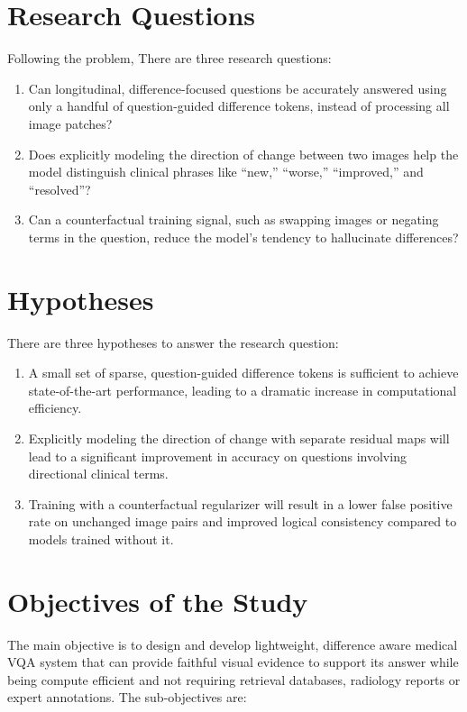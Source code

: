 \section{Research Questions}
Following the problem, There are three research questions:
\begin{enumerate}
    \item Can longitudinal, difference-focused questions be accurately answered using only a handful of question-guided difference tokens, instead of processing all image patches?
    \item Does explicitly modeling the direction of change between two images help the model distinguish clinical phrases like “new,” “worse,” “improved,” and “resolved”?
    \item Can a counterfactual training signal, such as swapping images or negating terms in the question, reduce the model’s tendency to hallucinate differences?
\end{enumerate}

\section{Hypotheses}
There are three hypotheses to answer the research question:
\begin{enumerate}
    \item A small set of sparse, question-guided difference tokens is sufficient to achieve state-of-the-art performance, leading to a dramatic increase in computational efficiency.
    \item Explicitly modeling the direction of change with separate residual maps will lead to a significant improvement in accuracy on questions involving directional clinical terms.
    \item Training with a counterfactual regularizer will result in a lower false positive rate on unchanged image pairs and improved logical consistency compared to models trained without it.
\end{enumerate}

\section{Objectives of the Study}
The main objective is to design and develop lightweight, difference aware medical VQA system that can provide faithful visual evidence to support its answer while being compute efficient and not requiring retrieval databases, radiology reports or expert annotations. The sub-objectives are:

